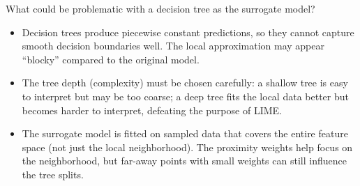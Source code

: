 {\begin{enumerate}[a)]
What could be problematic with a decision tree as the surrogate model?
\begin{itemize}
  \item Decision trees produce piecewise constant predictions, so they cannot capture smooth decision boundaries well. The local approximation may appear ``blocky'' compared to the original model.
  \item The tree depth (complexity) must be chosen carefully: a shallow tree is easy to interpret but may be too coarse; a deep tree fits the local data better but becomes harder to interpret, defeating the purpose of LIME.
  \item The surrogate model is fitted on sampled data that covers the entire feature space (not just the local neighborhood). The proximity weights help focus on the neighborhood, but far-away points with small weights can still influence the tree splits.
\end{itemize}



\end{enumerate}
}